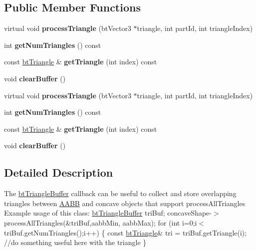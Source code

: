 \subsection*{Public Member Functions}
\begin{DoxyCompactItemize}
\item 
\mbox{\label{classbtTriangleBuffer_a511eed7cab5be9dc886314611a2fda9d}} 
virtual void {\bfseries process\+Triangle} (bt\+Vector3 $\ast$triangle, int part\+Id, int triangle\+Index)
\item 
\mbox{\label{classbtTriangleBuffer_a0661fb2bff4122347eb7c915b6e85e32}} 
int {\bfseries get\+Num\+Triangles} () const
\item 
\mbox{\label{classbtTriangleBuffer_a0bbebedae88130835a8af99bcd95b829}} 
const \hyperlink{structbtTriangle}{bt\+Triangle} \& {\bfseries get\+Triangle} (int index) const
\item 
\mbox{\label{classbtTriangleBuffer_a7fb6eab091904e3ebc4a206fee381a56}} 
void {\bfseries clear\+Buffer} ()
\item 
\mbox{\label{classbtTriangleBuffer_a8708e87be9be2ad21d37a43e5b063792}} 
virtual void {\bfseries process\+Triangle} (bt\+Vector3 $\ast$triangle, int part\+Id, int triangle\+Index)
\item 
\mbox{\label{classbtTriangleBuffer_a0661fb2bff4122347eb7c915b6e85e32}} 
int {\bfseries get\+Num\+Triangles} () const
\item 
\mbox{\label{classbtTriangleBuffer_a0bbebedae88130835a8af99bcd95b829}} 
const \hyperlink{structbtTriangle}{bt\+Triangle} \& {\bfseries get\+Triangle} (int index) const
\item 
\mbox{\label{classbtTriangleBuffer_a7fb6eab091904e3ebc4a206fee381a56}} 
void {\bfseries clear\+Buffer} ()
\end{DoxyCompactItemize}


\subsection{Detailed Description}
The \hyperlink{classbtTriangleBuffer}{bt\+Triangle\+Buffer} callback can be useful to collect and store overlapping triangles between \hyperlink{classAABB}{A\+A\+BB} and concave objects that support \textquotesingle{}process\+All\+Triangles\textquotesingle{} Example usage of this class\+: \hyperlink{classbtTriangleBuffer}{bt\+Triangle\+Buffer} tri\+Buf; concave\+Shape-\/$>$process\+All\+Triangles(\&tri\+Buf,aabb\+Min, aabb\+Max); for (int i=0;i$<$tri\+Buf.\+get\+Num\+Triangles();i++) \{ const \hyperlink{structbtTriangle}{bt\+Triangle}\& tri = tri\+Buf.\+get\+Triangle(i); //do something useful here with the triangle \} 

